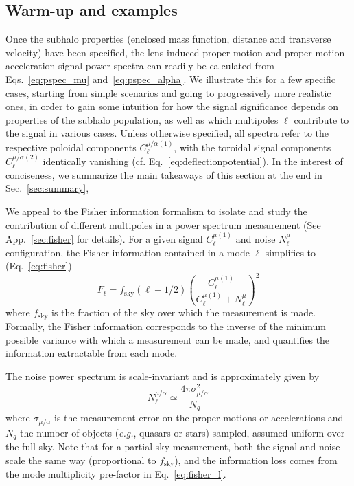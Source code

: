 \documentclass[twocolumn]{aastex63}
\begin{document}
\subsection{Warm-up and examples}
\label{sec:examples}

Once the subhalo properties (enclosed mass function, distance and transverse velocity) have been specified, the lens-induced proper motion and proper motion acceleration signal power spectra can readily be calculated from Eqs.~\ref{eq:pspec_mu} and~\ref{eq:pspec_alpha}. We illustrate this for a few specific cases, starting from simple scenarios and going to progressively more realistic ones, in order to gain some intuition for how the signal significance depends on properties of the subhalo population, as well as which multipoles $\ell$ contribute to the signal in various cases. Unless otherwise specified, all spectra refer to the respective poloidal components $C_{\ell}^{\mu/\alpha (1)}$, with the toroidal signal components $C_{\ell}^{\mu/\alpha (2)}$ identically vanishing (cf. Eq.~\ref{eq:deflectionpotential}). In the interest of conciseness, we summarize the main takeaways of this section at the end in Sec.~\ref{sec:summary},

We appeal to the Fisher information formalism to isolate and study the contribution of different multipoles in a power spectrum measurement (See App.~\ref{sec:fisher} for details). For a given signal $C_{\ell}^{\mu (1)}$ and noise $N_{\ell}^{\mu}$ configuration, the Fisher information contained in a mode $\ell$ simplifies to (Eq.~\ref{eq:fisher}) 
\begin{equation}
F_\ell = f_\mathrm{sky}(\ell + 1/2) \left(\frac{C_{\ell}^{\mu (1)}}{C_{\ell}^{\mu (1)} + N_{\ell}^{\mu}}\right)^2
\label{eq:fisher_l}
\end{equation}
where $f_\mathrm{sky}$ is the fraction of the sky over which the measurement is made. Formally, the Fisher information corresponds to the inverse of the minimum possible variance with which a measurement can be made, and quantifies the information extractable from each mode.

The noise power spectrum is scale-invariant and is approximately given by
\begin{equation}
N_{\ell}^{\mu/\alpha} \simeq \frac{4\pi\sigma_{\mu/\alpha}^2}{N_q}
\end{equation}
where $\sigma_{\mu/\alpha}$ is the measurement error on the proper motions or accelerations and $N_q$ the number of objects (\emph{e.g.}, quasars or stars) sampled, assumed uniform over the full sky. Note that for a partial-sky measurement, both the signal and noise scale the same way (proportional to $f_\mathrm{sky}$), and the information loss comes from the mode multiplicity pre-factor in Eq.~\ref{eq:fisher_l}.
\end{document}
